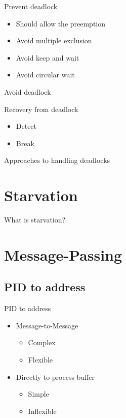 \documentclass[10pt, compress, aspectratio=169]{beamer}
\begin{document}
\begin{frame}{Prevent deadlock}
  \begin{itemize}
    \item Should allow the preemption
    \item Avoid multiple exclusion
    \item Avoid keep and wait
    \item Avoid circular wait
  \end{itemize}
\end{frame}

\begin{frame}{Avoid deadlock}
\end{frame}

\begin{frame}{Recovery from deadlock}
  \begin{itemize}
    \item Detect
    \item Break
  \end{itemize}
\end{frame}

\begin{frame}{Approaches to handling deadlocks}
\end{frame}

\section{Starvation}
\begin{frame}{What is starvation?}
\end{frame}

\section{Message-Passing}

\subsection{PID to address}
\begin{frame}{PID to address}
  \begin{itemize}
    \item Message-to-Message
      \begin{itemize}
        \item Complex
        \item Flexible
      \end{itemize}
    \item Directly to process buffer
      \begin{itemize}
        \item Simple
        \item Inflexible
      \end{itemize}
  \end{itemize}
\end{frame}
\end{document}
